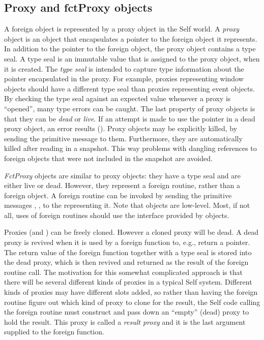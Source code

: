 \documentclass[letterpaper,10pt,english]{sphinxmanual}
\begin{document}
\subsection{Proxy and fctProxy objects}
\label{vmref:proxy-and-fctproxy-objects}\label{vmref:index-59}
A foreign object is represented by a proxy object in the Self world. A \emph{proxy} object is an object
that encapsulates a pointer to the foreign object it represents. In addition to the pointer to the foreign
object, the proxy object contains a type seal. A type seal is an immutable value that is assigned
to the proxy object, when it is created. The \emph{type seal} is intended to capture type information about
the pointer encapsulated in the proxy. For example, proxies representing window objects should
have a different type seal than proxies representing event objects. By checking the type seal against
an expected value whenever a proxy is “opened”, many type errors can be caught. The last property
of proxy objects is that they can be \emph{dead} or \emph{live}. If an attempt is made to use the pointer in a dead
proxy object, an error results (). Proxy objects may be explicitly killed, by
sending the primitive message  to them. Furthermore, they are automatically killed after
reading in a snapshot. This way problems with dangling references to foreign objects that were not
included in the snapshot are avoided.

\emph{FctProxy} objects are similar to proxy objects: they have a type seal and are either live or dead.
However, they represent a foreign routine, rather than a foreign object. A foreign routine can be invoked
by sending the primitive messages , ,
 to the  representing it. Note that  objects
are low-level. Most, if not all, uses of foreign routines should use the interface provided by 
objects.

Proxies (and ) can be freely cloned. However a cloned proxy will be dead. A dead
proxy is revived when it is used by a foreign function to, e.g., return a pointer. The return value of
the foreign function together with a type seal is stored into the dead proxy, which is then revived
and returned as the result of the foreign routine call. The motivation for this somewhat complicated
approach is that there will be several different kinds of proxies in a typical Self system. Different
kinds of proxies may have different slots added, so rather than having the foreign routine figure out
which kind of proxy to clone for the result, the Self code calling the foreign routine must construct
and pass down an “empty” (dead) proxy to hold the result. This proxy is called a \emph{result proxy}
and it is the last argument supplied to the foreign function.
\end{document}
